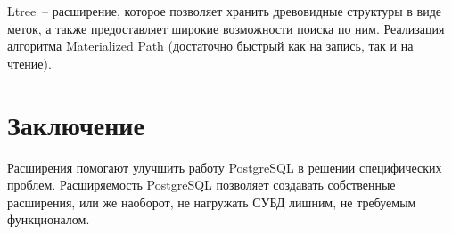 Ltree~-- расширение, которое позволяет хранить древовидные структуры в виде меток, а также предоставляет широкие возможности поиска по ним. Реализация алгоритма \href{http://en.wikipedia.org/wiki/Materialized\_path}{Materialized Path} (достаточно быстрый как на запись, так и на чтение).

\section{Заключение}
Расширения помогают улучшить работу PostgreSQL в решении специфических проблем. Расширяемость PostgreSQL позволяет создавать собственные расширения,
или же наоборот, не нагружать СУБД лишним, не требуемым функционалом.